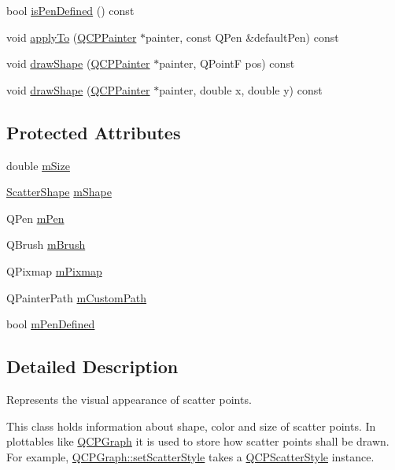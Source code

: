 \begin{DoxyCompactItemize}
bool \hyperlink{class_q_c_p_scatter_style_a7f1385a8d5e4f349a6b8030723fbd0f7}{is\-Pen\-Defined} () const 
\item 
void \hyperlink{class_q_c_p_scatter_style_a81817dfd404635f211e6ff2a04657d36}{apply\-To} (\hyperlink{class_q_c_p_painter}{Q\-C\-P\-Painter} $\ast$painter, const Q\-Pen \&default\-Pen) const 
\item 
void \hyperlink{class_q_c_p_scatter_style_a992d531ac471ec2b29bdec6aeb400a06}{draw\-Shape} (\hyperlink{class_q_c_p_painter}{Q\-C\-P\-Painter} $\ast$painter, Q\-Point\-F pos) const 
\item 
void \hyperlink{class_q_c_p_scatter_style_ae76811ac9f70ebf7a2b4c759853e6ed8}{draw\-Shape} (\hyperlink{class_q_c_p_painter}{Q\-C\-P\-Painter} $\ast$painter, double x, double y) const 
\end{DoxyCompactItemize}
\subsection*{Protected Attributes}
\begin{DoxyCompactItemize}
\item 
double \hyperlink{class_q_c_p_scatter_style_a757da98671eb06b221979373ac2cec91}{m\-Size}
\item 
\hyperlink{class_q_c_p_scatter_style_adb31525af6b680e6f1b7472e43859349}{Scatter\-Shape} \hyperlink{class_q_c_p_scatter_style_af1b327f35f107ed108290187bbc8c7c6}{m\-Shape}
\item 
Q\-Pen \hyperlink{class_q_c_p_scatter_style_a0f6a85e6d1e3ae1ca1b6efb4d4cdfe17}{m\-Pen}
\item 
Q\-Brush \hyperlink{class_q_c_p_scatter_style_a1b9c6ab10aebcaf236f1f45d1d6d64d1}{m\-Brush}
\item 
Q\-Pixmap \hyperlink{class_q_c_p_scatter_style_a7697346c89b19d4cd1d8dd33319ec9e3}{m\-Pixmap}
\item 
Q\-Painter\-Path \hyperlink{class_q_c_p_scatter_style_a813cb074744dc5a2f59cc99d6a10c6f0}{m\-Custom\-Path}
\item 
bool \hyperlink{class_q_c_p_scatter_style_a84ef5aa591ddba07b440f597e1669e78}{m\-Pen\-Defined}
\end{DoxyCompactItemize}


\subsection{Detailed Description}
Represents the visual appearance of scatter points. 

This class holds information about shape, color and size of scatter points. In plottables like \hyperlink{class_q_c_p_graph}{Q\-C\-P\-Graph} it is used to store how scatter points shall be drawn. For example, \hyperlink{class_q_c_p_graph_a12bd17a8ba21983163ec5d8f42a9fea5}{Q\-C\-P\-Graph\-::set\-Scatter\-Style} takes a \hyperlink{class_q_c_p_scatter_style}{Q\-C\-P\-Scatter\-Style} instance.

